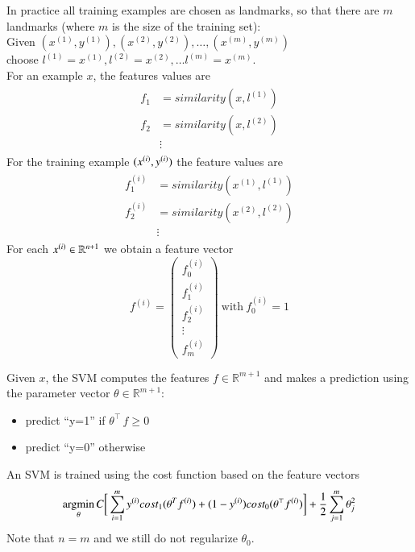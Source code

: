 \documentclass[a4paper,twoside,10pt]{article}
\begin{document}
In practice all training examples are chosen as landmarks, so that there are $m$ landmarks (where $m$ is the size of the training set):\\
Given $(x^{(1)},y^{(1)}),(x^{(2)},y^{(2)}),\ldots,(x^{(m)},y^{(m)})$\\
choose $l^{(1)}=x^{(1)},l^{(2)}=x^{(2)},\ldots l^{(m)}=x^{(m)}$.\\
For an example $x$, the features values are
\begin{align*}
  \begin{split}
    f_1&=similarity(x,l^{(1)})\\
    f_2&=similarity(x,l^{(2)})\\
    &\vdots
  \end{split}
\end{align*}
For the training example $(x^{(i)},y^{(i)})$ the feature values are
\begin{align*}
  \begin{split}
    f^{(i)}_1&=similarity(x^{(1)},l^{(1)})\\
    f^{(i)}_2&=similarity(x^{(2)},l^{(2)})\\
    &\vdots
  \end{split}
\end{align*}
For each $x^{(i)}\in\mathbb{R}^{n+1}$ we obtain a feature vector
\begin{equation*}
  f^{(i)}=\begin{pmatrix}f^{(i)}_0\\f^{(i)}_1\\f^{(i)}_2\\\vdots\\f^{(i)}_m\end{pmatrix}
    \mathrm{\ with\ }f^{(i)}_0=1
\end{equation*}

Given $x$, the \ac{SVM} computes the features $f\in\mathbb{R}^{m+1}$ and makes a prediction using the parameter vector $\theta\in\mathbb{R}^{m+1}$:
\begin{itemize}
  \item predict ``y=1'' if $\theta^\top\,f\ge 0$
  \item predict ``y=0'' otherwise
\end{itemize}
\newcommand{\sfi}{\ensuremath{f^{(i)}}}
\newcommand{\sli}{\ensuremath{l^{(i)}}}
An \ac{SVM} is trained using the cost function based on the feature vectors
\begin{equation*}
  \mathop{\operatorname{argmin}}_\theta C\bigg[\sumi\syi cost_1(\theta^T\sfi)+(1-\syi)cost_0(\theta^\top\sfi)\bigg]+\frac{1}{2}\sum_{j=1}^m\theta_j^2
\end{equation*}
Note that $n=m$ and we still do not regularize $\theta_0$.
\end{document}
